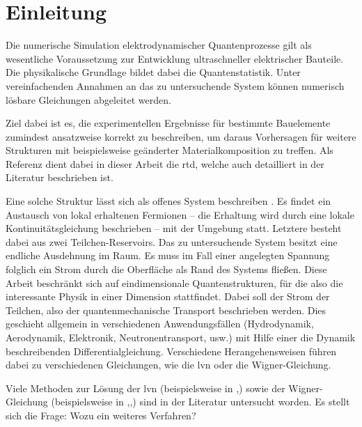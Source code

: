 \chapter{Einleitung}
\label{chap:einleitung}
Die numerische Simulation elektrodynamischer Quantenprozesse gilt als wesentliche Voraussetzung zur Entwicklung ultraschneller elektrischer Bauteile. Die physikalische Grundlage bildet dabei die Quantenstatistik. Unter vereinfachenden Annahmen an das zu untersuchende System können numerisch lösbare Gleichungen abgeleitet werden.

Ziel dabei ist es, die experimentellen Ergebnisse für bestimmte Bauelemente zumindest ansatzweise korrekt zu beschreiben, um daraus Vorhersagen für weitere Strukturen mit beispielsweise geänderter Materialkomposition zu treffen. Als Referenz dient dabei in dieser Arbeit die \ac{rtd}, welche auch detailliert in der Literatur \cite{wiedenhaus} beschrieben ist.

Eine solche Struktur lässt sich als offenes System beschreiben \cite{frensley}. Es findet ein Austausch von lokal erhaltenen Fermionen -- die Erhaltung wird durch eine lokale Kontinuitätsgleichung beschrieben -- mit der Umgebung statt. Letztere besteht dabei aus zwei Teilchen-Reservoirs. Das zu untersuchende System besitzt eine endliche Ausdehnung im Raum. Es muss im Fall einer angelegten Spannung folglich ein Strom durch die Oberfläche als Rand des Systems fließen. Diese Arbeit beschränkt sich auf eindimensionale Quantenstrukturen, für die also die interessante Physik in einer Dimension stattfindet. Dabei soll der Strom der Teilchen, also der quantenmechanische Transport beschrieben werden. Dies geschieht allgemein in verschiedenen Anwendungsfällen (Hydrodynamik, Aerodynamik, Elektronik, Neutronentransport, usw.) mit Hilfe einer die Dynamik beschreibenden Differentialgleichung. Verschiedene Herangehensweisen führen dabei zu verschiedenen Gleichungen, wie die \ac{lvn} oder die Wigner-Gleichung.

Viele Methoden zur Lösung der \ac{lvn}  (beispielsweise in \cite{frensley2},\cite{lukas1}) sowie der Wigner-Gleichung (beispielsweise in \cite{rossi1994monte},\cite{ringhofer},\cite{van2017efficient}) sind in der Literatur untersucht worden. Es stellt sich die Frage: Wozu ein weiteres Verfahren?

